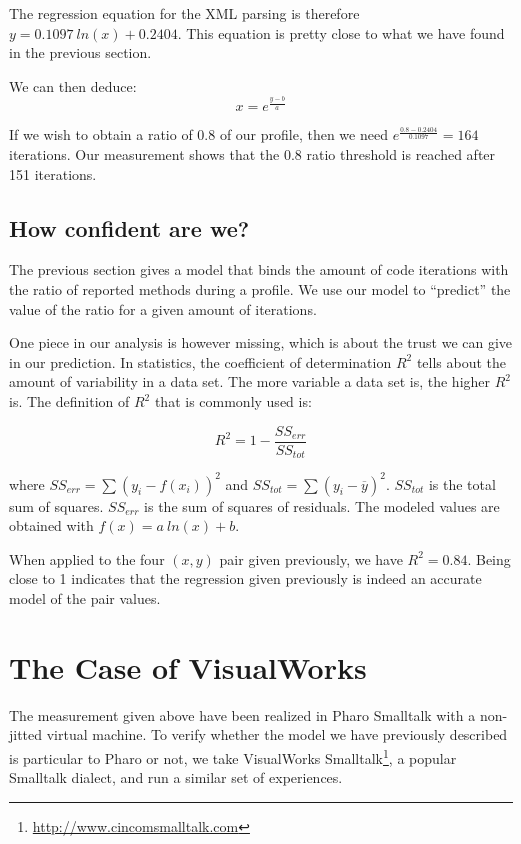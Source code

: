 \documentclass{sig-alternate}
\newcommand{\seclabel}[1]{\label{sec:#1}}
\begin{document}
The regression equation for the XML parsing is therefore $y = 0.1097~ln(x) + 0.2404$. This equation is pretty close to what we have found in the previous section.

We can then deduce:
\[
x = e^{\frac{y-b}{a}}
\]

If we wish to obtain a ratio of 0.8 of our profile, then we need $e^{\frac{0.8 - 0.2404}{0.1097}} = 164$ iterations. Our measurement shows that the 0.8 ratio threshold is reached after 151 iterations.


\subsection{How confident are we?} \seclabel{rSquared}


The previous section gives a model that binds the amount of code iterations with the ratio of reported methods during a profile. We use our model to ``predict'' the value of the ratio for a given amount of iterations.

One piece in our analysis is however missing, which is about the trust we can give in our prediction. In statistics, the coefficient of determination $R^2$ tells about the amount of variability in a data set. The more variable a data set is, the higher $R^2$ is. The definition of $R^2$ that is commonly used is:

\[
R^2 = 1 - \frac{SS_{err}}{SS_{tot}}
\]

where  $SS_{err}  =  \sum (y_i - f(x_i))^2$ and $SS_{tot}  =  \sum (y_i - \overline{y})^2$. $SS_{tot}$ is the total sum of squares. $SS_{err}$ is the sum of squares of residuals. The modeled values are obtained with $f(x) = a~ln(x) + b$.

When applied to the four $(x, y)$ pair given previously, we have $R^2 = 0.84$. Being close to 1 indicates that the regression given previously is indeed an accurate model of the pair values.

\section{The Case of VisualWorks}\seclabel{comparison}

The measurement given above have been realized in Pharo Smalltalk with a non-jitted virtual machine. To verify whether the model we have previously described is particular to Pharo or not, we take VisualWorks Smalltalk\footnote{\url{http://www.cincomsmalltalk.com}}, a popular Smalltalk dialect, and run a similar set of experiences.
\end{document}
